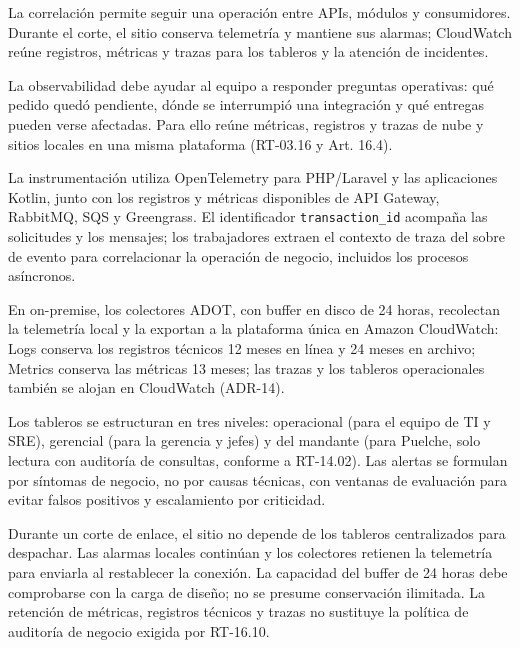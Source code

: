 La correlación permite seguir una operación entre APIs, módulos y consumidores. Durante el corte, el sitio conserva telemetría y mantiene sus alarmas; CloudWatch reúne registros, métricas y trazas para los tableros y la atención de incidentes.


La observabilidad debe ayudar al equipo a responder preguntas operativas: qué pedido quedó pendiente, dónde se interrumpió una integración y qué entregas pueden verse afectadas. Para ello reúne métricas, registros y trazas de nube y sitios locales en una misma plataforma (RT-03.16 y Art. 16.4).

La instrumentación utiliza OpenTelemetry para PHP/Laravel y las aplicaciones Kotlin, junto con los registros y métricas disponibles de API Gateway, RabbitMQ, SQS y Greengrass. El identificador \texttt{transaction\_id} acompaña las solicitudes y los mensajes; los trabajadores extraen el contexto de traza del sobre de evento para correlacionar la operación de negocio, incluidos los procesos asíncronos.

En on-premise, los colectores ADOT, con buffer en disco de 24 horas, recolectan la telemetría local y la exportan a la plataforma única en Amazon CloudWatch: Logs conserva los registros técnicos 12 meses en línea y 24 meses en archivo; Metrics conserva las métricas 13 meses; las trazas y los tableros operacionales también se alojan en CloudWatch (ADR-14).

Los tableros se estructuran en tres niveles: operacional (para el equipo de TI y SRE), gerencial (para la gerencia y jefes) y del mandante (para Puelche, solo lectura con auditoría de consultas, conforme a RT-14.02). Las alertas se formulan por síntomas de negocio, no por causas técnicas, con ventanas de evaluación para evitar falsos positivos y escalamiento por criticidad.

Durante un corte de enlace, el sitio no depende de los tableros centralizados para despachar. Las alarmas locales continúan y los colectores retienen la telemetría para enviarla al restablecer la conexión. La capacidad del buffer de 24 horas debe comprobarse con la carga de diseño; no se presume conservación ilimitada. La retención de métricas, registros técnicos y trazas no sustituye la política de auditoría de negocio exigida por RT-16.10.

